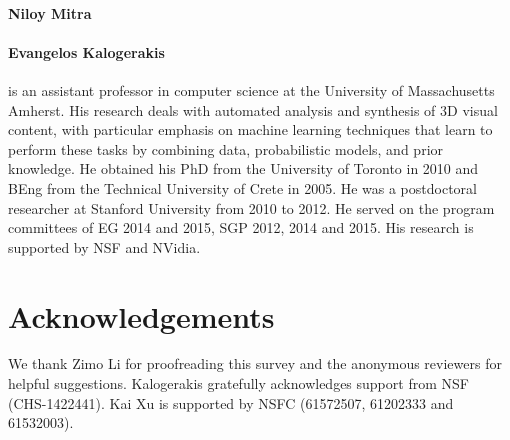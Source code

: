 \paragraph*{Niloy Mitra} 



\paragraph*{Evangelos Kalogerakis} is an assistant professor in computer science at the University of Massachusetts Amherst. His research deals with automated analysis and synthesis of 3D visual content, with particular emphasis on machine learning techniques that learn to perform these tasks by combining data, probabilistic models, and prior knowledge. He obtained his PhD from the University of Toronto in 2010 and BEng from the Technical University of Crete in 2005. He was a postdoctoral researcher at Stanford University from 2010 to 2012.  He served on the program committees of EG 2014 and 2015, SGP 2012, 2014 and 2015. His research is supported by NSF and NVidia.


\section*{Acknowledgements}
We thank Zimo Li for proofreading this survey and the anonymous reviewers for helpful suggestions.
Kalogerakis gratefully acknowledges support from NSF (CHS-1422441).
Kai Xu is supported by NSFC (61572507, 61202333 and 61532003).

